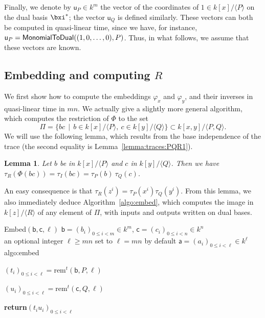\documentclass{sig-alternate}
\def\va {\ensuremath{\mathsf{a}}}
\def\vu {\ensuremath{\mathsf{u}}}
\def\vb {\ensuremath{\mathsf{b}}}
\def\vc {\ensuremath{\mathsf{c}}}
\def\rem {\ensuremath{\mathrm{rem}}}
\newcounter{algo}
\newenvironment{algorithm_endline}[4]{\small\begin{center}\begin{minipage}{0.48\textwidth}
      \refstepcounter{algo}
      \label{#4}
      \sf
      \rule{\textwidth}{0.2pt}\\
      \makebox[\textwidth][c]{Algorithm~\arabic{algo}:~\textbf{#1}}\\
      \rule[0.5\baselineskip]{\textwidth}{0.2pt}\\

      \vspace{-12pt}

      \parbox{\textwidth}{\textbf{Input} #2}
      \parbox{\textwidth}{\textbf{Output} #3}

\vspace{-7pt}

      \begin{enumerate*}}{\end{enumerate*}
      \vspace{-11pt}
      \rule{\textwidth}{0.2pt}
\end{minipage}\end{center}
}
\newcommand{\ang}[1]{\langle#1\rangle}
\newtheorem{Lemma}{Lemma}
\begin{document}
Finally, we denote by $\vu_P \in k^m$ the vector of the coordinates of
$1 \in k[x]/\ang{P}$ on the dual basis $\bxi^\ast$; the vector
$\vu_Q$ is defined similarly. These vectors can both be computed in
quasi-linear time, since we have, for instance, $\vu_P = {\sf
  MonomialToDual}((1,0,\dots,0), P)$. Thus, in what follows, we assume
that these vectors are known.


\subsection{Embedding and computing $R$} 

We first show how to compute the embeddings $\varphi_x$ and
$\varphi_y$, and their inverses in quasi-linear time in $mn$. We
actually give a slightly more general algorithm, which computes the
restriction of $\Phi$ to the set $$\Pi= \{bc \,\mid\, b\in
k[x]/\ang{P},\ c\in k[y]/\ang{Q}\} \subset k[x,y]/\ang{P,Q}.$$ We
will use the following lemma, which results from the base independence
of the trace (the second equality is Lemma~\ref{lemma:traces:PQR1}).
\begin{Lemma}
  \label{lemma:traces:PQR}
  Let $b$ be in $k[x]/\ang{P}$ and $c$ in $k[y]/\ang{Q}$. Then we have
  $\tau_R(\Phi(bc)) = \tau_I(bc) = \tau_P(b) \ \tau_Q(c)$.
\end{Lemma}
An easy consequence is that $\tau_R(z^i) =
\tau_P(x^i)\tau_Q(y^i)$. From this lemma, we also immediately deduce
Algorithm~\ref{algo:embed}, which computes the image in $k[z]/\ang{R}$
of any element of $\Pi$, with inputs and outputs written on dual
bases.

\vspace{-2ex}

\begin{algorithm_endline}
{Embed$(\vb,\vc,\ell)$}
{$\vb=(b_i)_{0 \le i < m} \in k^m$, $\vc=(c_i)_{0 \le i < n} \in k^n$\\
    an optional integer $\ell \ge mn$ set to $\ell=mn$ by default}
{$\va=(a_i)_{0 \le i < \ell} \in k^{\ell}$}
{algo:embed}
\item $(t_i)_{0\le i<\ell} = \rem^t(\vb,P,\ell)$
\item $(u_i)_{0\le i<\ell} = \rem^t(\vc,Q,\ell)$
\item {\bf return}$(t_i u_i)_{0 \le i <\ell}$
\end{algorithm_endline}
\end{document}
